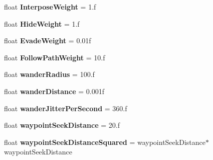 \begin{DoxyCompactItemize}
\item 
\hypertarget{structsteer_1_1_behavior_parameters_ac95564e74c40c7cb0828f61df50058b8}{float {\bfseries Interpose\-Weight} = 1.f}\label{structsteer_1_1_behavior_parameters_ac95564e74c40c7cb0828f61df50058b8}

\item 
\hypertarget{structsteer_1_1_behavior_parameters_ad81a43119ffa7efc0660a3d7d1ec914b}{float {\bfseries Hide\-Weight} = 1.f}\label{structsteer_1_1_behavior_parameters_ad81a43119ffa7efc0660a3d7d1ec914b}

\item 
\hypertarget{structsteer_1_1_behavior_parameters_a252349a5bb4b3b206d29dc192e358b1f}{float {\bfseries Evade\-Weight} = 0.\-01f}\label{structsteer_1_1_behavior_parameters_a252349a5bb4b3b206d29dc192e358b1f}

\item 
\hypertarget{structsteer_1_1_behavior_parameters_abbf3dc49401940ffe6aaac07c9d2379a}{float {\bfseries Follow\-Path\-Weight} = 10.f}\label{structsteer_1_1_behavior_parameters_abbf3dc49401940ffe6aaac07c9d2379a}

\item 
\hypertarget{structsteer_1_1_behavior_parameters_a9eb3e6693c273e5eebd5d8181608b588}{float {\bfseries wander\-Radius} = 100.f}\label{structsteer_1_1_behavior_parameters_a9eb3e6693c273e5eebd5d8181608b588}

\item 
\hypertarget{structsteer_1_1_behavior_parameters_ab591c887f460e163136db7e908bc8b6f}{float {\bfseries wander\-Distance} = 0.\-001f}\label{structsteer_1_1_behavior_parameters_ab591c887f460e163136db7e908bc8b6f}

\item 
\hypertarget{structsteer_1_1_behavior_parameters_a56c5f6bcf76d9e3a4f6164c480b69464}{float {\bfseries wander\-Jitter\-Per\-Second} = 360.f}\label{structsteer_1_1_behavior_parameters_a56c5f6bcf76d9e3a4f6164c480b69464}

\item 
\hypertarget{structsteer_1_1_behavior_parameters_a15b6a80c0553a533c01b72690738ab8c}{float {\bfseries waypoint\-Seek\-Distance} = 20.f}\label{structsteer_1_1_behavior_parameters_a15b6a80c0553a533c01b72690738ab8c}

\item 
\hypertarget{structsteer_1_1_behavior_parameters_a697f59d8d7c765b1da478668861c28aa}{float {\bfseries waypoint\-Seek\-Distance\-Squared} = waypoint\-Seek\-Distance$\ast$waypoint\-Seek\-Distance}\label{structsteer_1_1_behavior_parameters_a697f59d8d7c765b1da478668861c28aa}


\end{DoxyCompactItemize}
